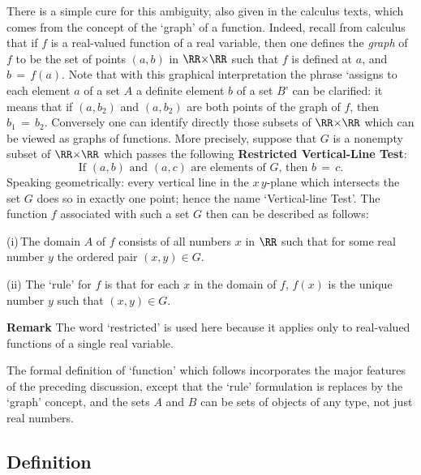         There is a simple cure for this ambiguity, also given in the calculus texts, which comes from the concept of the `graph' of a function.
    Indeed, recall from calculus that if $f$ is a real-valued function of a real variable,
    then one defines the {\em graph} of $f$ to be the set of points $(a,b)$ in ${\RR}{\times}{\RR}$ such that $f$ is defined at $a$, and $b \,=\, f(a)$.
    Note that with this graphical interpretation the phrase `assigns to each element $a$ of a set $A$ a definite element $b$ of a set $B$' can be clarified:
    it means that if $(a,b_{2})$ and $(a,b_{2})$ are both points of the graph of $f$, then $b_{1} \,=\, b_{2}$.
    Conversely one can identify directly those subsets of ${\RR}{\times}{\RR}$ which can be viewed as graphs of functions.
    More precisely, suppose that $G$ is a nonempty subset of ${\RR}{\times}{\RR}$ which passes the following
    {\bf Restricted Vertical-Line Test}:
        \begin{displaymath}
        \mbox{If $(a,b)$ and $(a,c)$ are elements of $G$, then $b \,=\, c$.} 
        \end{displaymath}
    Speaking geometrically: every vertical line in the $x\,y$-plane which intersects
    the set $G$ does so in exactly one point; hence the name `Vertical-line Test'.
    The function $f$ associated with such a set $G$ then can be described as follows:

        (i)\,The domain $A$ of $f$ consists of all numbers $x$ in ${\RR}$ such that for some real number $y$ the ordered pair $(x,y){\in}G$.

        (ii) The `rule' for $f$ is that for each $x$ in the domain of $f$, $f(x)$ is the unique number $y$ such that $(x,y){\in}G$.

\VA

        {\bf Remark} The word `restricted' is used here because it applies only to real-valued functions of a single real variable.
    

\V

        The formal definition of `function' which follows incorporates the major features of the preceding discussion,
    except that the `rule' formulation is replaces by the `graph' concept, and the sets $A$ and $B$ can be sets of objects of any type, not just real numbers. 

\V
\V

            \subsection{\small{\bf Definition}}
            \label{DefA30.10}

